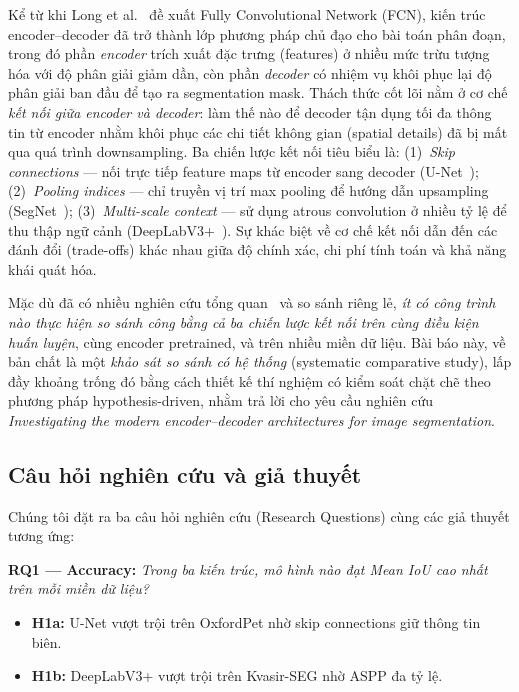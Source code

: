 \documentclass{article}
\begin{document}
Kể từ khi Long et al.~\cite{long2015fcn} đề xuất Fully Convolutional Network (FCN), kiến trúc encoder--decoder đã trở thành lớp phương pháp chủ đạo cho bài toán phân đoạn, trong đó phần \emph{encoder} trích xuất đặc trưng (features) ở nhiều mức trừu tượng hóa với độ phân giải giảm dần, còn phần \emph{decoder} có nhiệm vụ khôi phục lại độ phân giải ban đầu để tạo ra segmentation mask.
Thách thức cốt lõi nằm ở cơ chế \emph{kết nối giữa encoder và decoder}: làm thế nào để decoder tận dụng tối đa thông tin từ encoder nhằm khôi phục các chi tiết không gian (spatial details) đã bị mất qua quá trình downsampling.
Ba chiến lược kết nối tiêu biểu là:
(1)~\emph{Skip connections} --- nối trực tiếp feature maps từ encoder sang decoder (U-Net~\cite{ronneberger2015unet});
(2)~\emph{Pooling indices} --- chỉ truyền vị trí max pooling để hướng dẫn upsampling (SegNet~\cite{badrinarayanan2017segnet});
(3)~\emph{Multi-scale context} --- sử dụng atrous convolution ở nhiều tỷ lệ để thu thập ngữ cảnh (DeepLabV3+~\cite{chen2018deeplabv3plus}).
Sự khác biệt về cơ chế kết nối dẫn đến các đánh đổi (trade-offs) khác nhau giữa độ chính xác, chi phí tính toán và khả năng khái quát hóa.

Mặc dù đã có nhiều nghiên cứu tổng quan~\cite{minaee2021image} và so sánh riêng lẻ, \emph{ít có công trình nào thực hiện so sánh công bằng cả ba chiến lược kết nối trên cùng điều kiện huấn luyện}, cùng encoder pretrained, và trên nhiều miền dữ liệu.
Bài báo này, về bản chất là một \emph{khảo sát so sánh có hệ thống} (systematic comparative study), lấp đầy khoảng trống đó bằng cách thiết kế thí nghiệm có kiểm soát chặt chẽ theo phương pháp hypothesis-driven, nhằm trả lời cho yêu cầu nghiên cứu \emph{Investigating the modern encoder--decoder architectures for image segmentation}.

\subsection{Câu hỏi nghiên cứu và giả thuyết}

Chúng tôi đặt ra ba câu hỏi nghiên cứu (Research Questions) cùng các giả thuyết tương ứng:

\textbf{RQ1 --- Accuracy:} \emph{Trong ba kiến trúc, mô hình nào đạt Mean IoU cao nhất trên mỗi miền dữ liệu?}
\begin{itemize}
    \item \textbf{H1a:} U-Net vượt trội trên OxfordPet nhờ skip connections giữ thông tin biên.
    \item \textbf{H1b:} DeepLabV3+ vượt trội trên Kvasir-SEG nhờ ASPP đa tỷ lệ.
\end{itemize}
\end{document}

